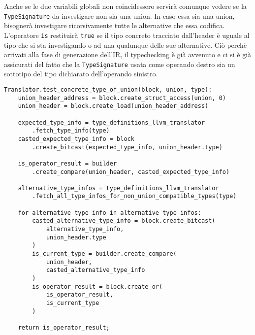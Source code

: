 Anche se le due variabili globali non coincidessero servirà comunque vedere se la \texttt{TypeSignature} 
da investigare non sia una union. In caso essa sia una union, bisognerà investigare ricorsivamente tutte le alternative che essa codifica. \\

L'operatore \texttt{is} restituirà \texttt{true} se il tipo concreto tracciato dall'header è uguale al tipo che si sta investigando o ad una qualunque delle sue alternative. Ciò 
perchè arrivati alla fase di generazione dell'IR, il typechecking è già avvenuto e ci si è già assicurati del fatto che la \texttt{TypeSignature} usata come operando 
destro sia un sottotipo del tipo dichiarato dell'operando sinistro. \\

\vspace{0.5cm}
\begin{lstlisting}[frame=single]
Translator.test_concrete_type_of_union(block, union, type):
    union_header_address = block.create_struct_access(union, 0)
    union_header = block.create_load(union_header_address)
    
    expected_type_info = type_definitions_llvm_translator
        .fetch_type_info(type)
    casted_expected_type_info = block
        .create_bitcast(expected_type_info, union_header.type)
    
    is_operator_result = builder
        .create_compare(union_header, casted_expected_type_info)
    
    alternative_type_infos = type_definitions_llvm_translator
        .fetch_all_type_infos_for_non_union_compatible_types(type)

    for alternative_type_info in alternative_type_infos:
        casted_alternative_type_info = block.create_bitcast(
            alternative_type_info, 
            union_header.type
        )
        is_current_type = builder.create_compare(
            union_header, 
            casted_alternative_type_info
        )
        is_operator_result = block.create_or(
            is_operator_result, 
            is_current_type
        )
    
    return is_operator_result;
\end{lstlisting}
\vspace{0.5cm}